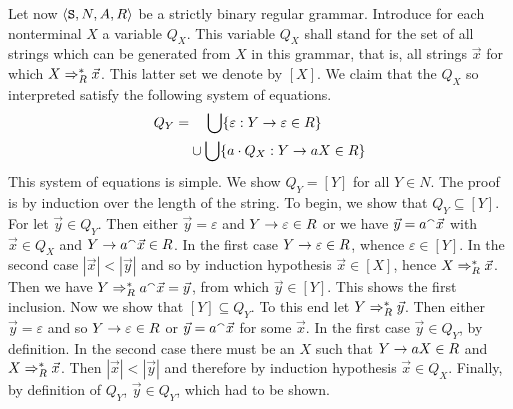 Let now $\langle \mbox{\tt S}, N, A, R\rangle$ be a strictly binary
regular grammar. Introduce for each nonterminal
$X$ a variable $Q_X$. This variable $Q_X$ shall stand for the
set of all strings which can be generated from $X$ in this
grammar, that is, all strings $\vec{x}$ for which
$X \Rightarrow^{\ast}_R \vec{x}$. This latter set we denote by
$[X]$. We claim that the $Q_X$ so interpreted satisfy the
following system of equations.
\begin{equation}
\begin{split}
Q_Y = & \phantom{\mbox{}\cup\mbox{}} 
	\bigcup \{\varepsilon : Y \pf \varepsilon \in R \} \\
    & \cup \bigcup \{a \cdot Q_X : Y \pf aX \in R\}
\end{split}
\end{equation}
This system of equations is simple. We show $Q_Y = [Y]$ for all $Y
\in N$. The proof is by induction over the length of the string.
To begin, we show that $Q_Y \subseteq [Y]$. For let $\vec{y} \in
Q_Y$. Then either $\vec{y} = \varepsilon$ and $Y \rightarrow \varepsilon
\in R$ or we have $\vec{y} = a {^{\smallfrown}} \vec{x}$ with $\vec{x} \in
Q_X$ and $Y \rightarrow a {^{\smallfrown}} \vec{x} \in R$. In the first case $Y \rightarrow
\varepsilon \in R$, whence $\varepsilon \in [Y]$. In the second
case $|\vec{x}| < |\vec{y}|$ and so by induction hypothesis
$\vec{x} \in [X]$, hence $X \Rightarrow^{\ast}_R \vec{x}$. Then we have 
$Y \Rightarrow^{\ast}_R a {^{\smallfrown}} \vec{x} = \vec{y}$, from which $\vec{y} 
\in [Y]$. This shows the first inclusion. Now we show that 
$[Y] \subseteq Q_Y$. To this end let $Y \Rightarrow^{\ast}_R \vec{y}$. 
Then either $\vec{y} = \varepsilon$ and so $Y \rightarrow \varepsilon 
\in R$ or $\vec{y} = a {^{\smallfrown}} \vec{x}$ for some $\vec{x}$.  In 
the first case $\vec{y} \in Q_Y$, by definition. In the second 
case there must be an $X$ such that $Y \rightarrow a X \in R$ and 
$X \Rightarrow^{\ast}_R \vec{x}$. Then $|\vec{x}| < |\vec{y}|$ and 
therefore by induction hypothesis $\vec{x} \in Q_X$. Finally, 
by definition of $Q_Y$, $\vec{y} \in Q_Y$, which had to be shown.


